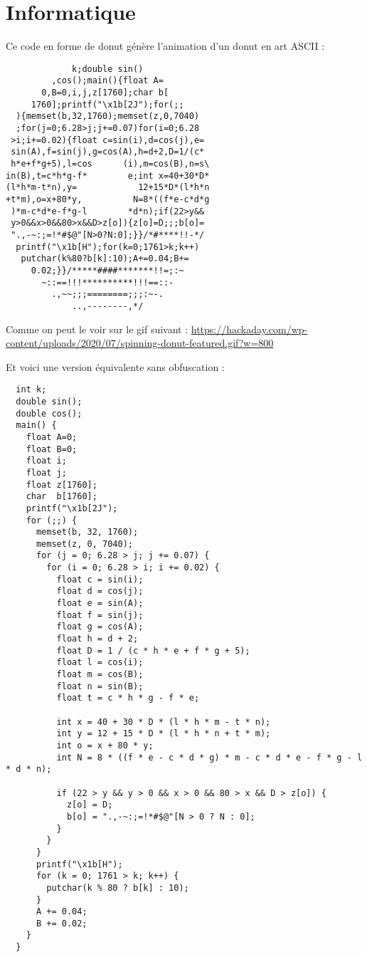 \documentclass[12pt]{article}
\begin{document}
\filbreak
\section{Informatique}

Ce code en forme de donut génère l'animation d'un donut en art ASCII  :

\begin{lstlisting}
             k;double sin()
         ,cos();main(){float A=
       0,B=0,i,j,z[1760];char b[
     1760];printf("\x1b[2J");for(;;
  ){memset(b,32,1760);memset(z,0,7040)
  ;for(j=0;6.28>j;j+=0.07)for(i=0;6.28
 >i;i+=0.02){float c=sin(i),d=cos(j),e=
 sin(A),f=sin(j),g=cos(A),h=d+2,D=1/(c*
 h*e+f*g+5),l=cos      (i),m=cos(B),n=s\
in(B),t=c*h*g-f*        e;int x=40+30*D*
(l*h*m-t*n),y=            12+15*D*(l*h*n
+t*m),o=x+80*y,          N=8*((f*e-c*d*g
 )*m-c*d*e-f*g-l        *d*n);if(22>y&&
 y>0&&x>0&&80>x&&D>z[o]){z[o]=D;;;b[o]=
 ".,-~:;=!*#$@"[N>0?N:0];}}/*#****!!-*/
  printf("\x1b[H");for(k=0;1761>k;k++)
   putchar(k%80?b[k]:10);A+=0.04;B+=
     0.02;}}/*****####*******!!=;:~
       ~::==!!!**********!!!==::-
         .,~~;;;========;;;:~-.
             ..,--------,*/
\end{lstlisting}

Comme on peut le voir sur le gif suivant : \textcolor{blue}{\url{https://hackaday.com/wp-content/uploads/2020/07/spinning-donut-featured.gif?w=800}}

\filbreak
Et voici une version équivalente sans obfuscation :

\begin{lstlisting}
  int k;
  double sin();
  double cos();
  main() {
    float A=0;
    float B=0;
    float i;
    float j;
    float z[1760];
    char  b[1760];
    printf("\x1b[2J");
    for (;;) {
      memset(b, 32, 1760);
      memset(z, 0, 7040);
      for (j = 0; 6.28 > j; j += 0.07) {
        for (i = 0; 6.28 > i; i += 0.02) {
          float c = sin(i);
          float d = cos(j);
          float e = sin(A);
          float f = sin(j);
          float g = cos(A);
          float h = d + 2;
          float D = 1 / (c * h * e + f * g + 5);
          float l = cos(i);
          float m = cos(B);
          float n = sin(B);
          float t = c * h * g - f * e;
   
          int x = 40 + 30 * D * (l * h * m - t * n);
          int y = 12 + 15 * D * (l * h * n + t * m);
          int o = x + 80 * y;
          int N = 8 * ((f * e - c * d * g) * m - c * d * e - f * g - l * d * n);
   
          if (22 > y && y > 0 && x > 0 && 80 > x && D > z[o]) {
            z[o] = D;
            b[o] = ".,-~:;=!*#$@"[N > 0 ? N : 0];
          }
        }
      }
      printf("\x1b[H");
      for (k = 0; 1761 > k; k++) {
        putchar(k % 80 ? b[k] : 10);
      }
      A += 0.04;
      B += 0.02;
    }
  }
\end{lstlisting}

\newpage


\end{document}
